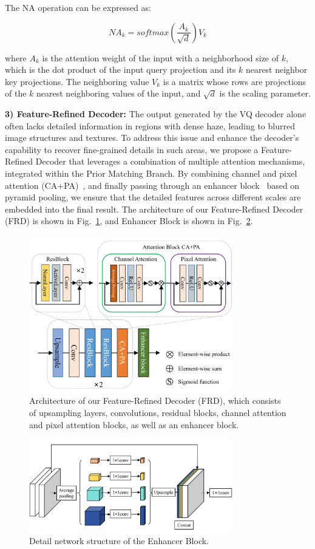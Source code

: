 \documentclass[journal]{IEEEtran}
\begin{document}
The NA operation can be expressed as:

\begin{equation}
	\label{NA_operation}
	NA_{k} = softmax (\frac{A_{k}}{\sqrt{d}}) V_{k}
\end{equation}

where $A_{k}$ is the attention weight of the input with a neighborhood size of $k$, which is the dot product of the input query projection and its $k$ nearest neighbor key projections. The neighboring value $V_k$ is a matrix whose rows are projections of the $k$ nearest neighboring values of the input, and $\sqrt{d}$ is the scaling parameter.

	{\bf{3) Feature-Refined Decoder:}} The output generated by the VQ decoder alone often lacks detailed information in regions with dense haze, leading to blurred image structures and textures. To address this issue and enhance the decoder's capability to recover fine-grained details in such areas, we propose a Feature-Refined Decoder that leverages a combination of multiple attention mechanisms, integrated within the Prior Matching Branch. By combining channel and pixel attention (CA+PA)~\cite{qin2020ffa}, and finally passing through an enhancer block~\cite{qu2019enhanced} based on pyramid pooling, we ensure that the detailed features across different scales are embedded into the final result. The architecture of our Feature-Refined Decoder (FRD) is shown in Fig.~\ref{fig3}, and Enhancer Block is shown in Fig.~\ref{fig4}.

\begin{figure}[!t]
	\centering
	\includegraphics[width=3.49in]{enhanced_decoder}
	\caption{Architecture of our Feature-Refined Decoder (FRD), which consists of upsampling layers, convolutions, residual blocks, channel attention and pixel attention blocks, as well as an enhancer block. }
	\label{fig3}
\end{figure}
\begin{figure}[!t]
	\centering
	\includegraphics[width=3.49in]{enhancer_block}
	\caption{Detail network structure of the Enhancer Block.}
	\label{fig4}
\end{figure}
\end{document}
